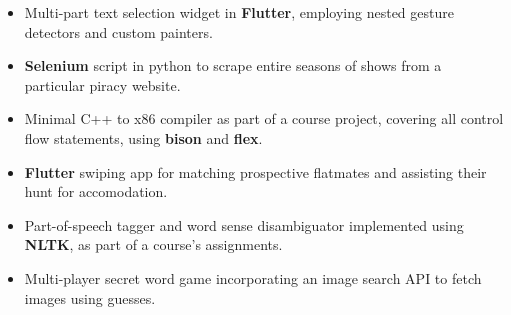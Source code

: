 \begin{itemize}[itemsep = -1.3 mm, leftmargin=*]
    \item Multi-part text selection widget in \textbf{Flutter}, employing nested gesture detectors and custom painters.
    \item \textbf{Selenium} script in python to scrape entire seasons of shows from a particular piracy website.
    \item Minimal C++ to x86 compiler as part of a course project, covering all control flow statements, using \textbf{bison} and \textbf{flex}.
    \item \textbf{Flutter} swiping app for matching prospective flatmates and assisting their hunt for accomodation.
    \item Part-of-speech tagger and word sense disambiguator implemented using \textbf{NLTK}, as part of a course's assignments.
    \item Multi-player secret word game incorporating an image search API to fetch images using guesses.
\end{itemize}